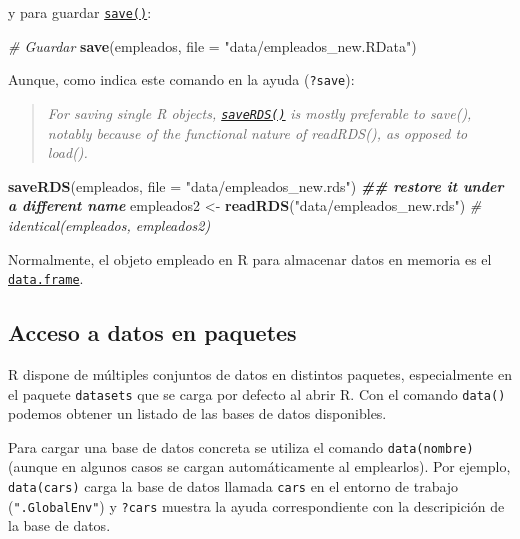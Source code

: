 \documentclass[
]{book}
\newenvironment{Shaded}{\begin{snugshade}}{\end{snugshade}}
\newcommand{\AttributeTok}[1]{\textcolor[rgb]{0.13,0.29,0.53}{#1}}
\newcommand{\CommentTok}[1]{\textcolor[rgb]{0.56,0.35,0.01}{\textit{#1}}}
\newcommand{\DocumentationTok}[1]{\textcolor[rgb]{0.56,0.35,0.01}{\textbf{\textit{#1}}}}
\newcommand{\FunctionTok}[1]{\textcolor[rgb]{0.13,0.29,0.53}{\textbf{#1}}}
\newcommand{\NormalTok}[1]{#1}
\newcommand{\OtherTok}[1]{\textcolor[rgb]{0.56,0.35,0.01}{#1}}
\newcommand{\StringTok}[1]{\textcolor[rgb]{0.31,0.60,0.02}{#1}}
\begin{document}
y para guardar \href{https://www.rdocumentation.org/packages/base/versions/3.6.1/topics/save}{\texttt{save()}}:

\begin{Shaded}
\begin{Highlighting}[]
\CommentTok{\# Guardar}
\FunctionTok{save}\NormalTok{(empleados, }\AttributeTok{file =} \StringTok{"data/empleados\_new.RData"}\NormalTok{)}
\end{Highlighting}
\end{Shaded}

Aunque, como indica este comando en la ayuda (\texttt{?save}):

\begin{quote}
\emph{For saving single R objects, \href{https://www.rdocumentation.org/packages/base/versions/3.6.1/topics/saveRDS}{\texttt{saveRDS()}}}
\emph{is mostly preferable to save(),}
\emph{notably because of the functional nature of readRDS(), as opposed to load().}
\end{quote}

\begin{Shaded}
\begin{Highlighting}[]
\FunctionTok{saveRDS}\NormalTok{(empleados, }\AttributeTok{file =} \StringTok{"data/empleados\_new.rds"}\NormalTok{)}
\DocumentationTok{\#\# restore it under a different name}
\NormalTok{empleados2 }\OtherTok{\textless{}{-}} \FunctionTok{readRDS}\NormalTok{(}\StringTok{"data/empleados\_new.rds"}\NormalTok{)}
\CommentTok{\# identical(empleados, empleados2)}
\end{Highlighting}
\end{Shaded}

Normalmente, el objeto empleado en R para almacenar datos en memoria
es el \href{https://www.rdocumentation.org/packages/base/versions/3.6.1/topics/data.frame}{\texttt{data.frame}}.

\hypertarget{acceso-a-datos-en-paquetes}{%
\subsection{Acceso a datos en paquetes}\label{acceso-a-datos-en-paquetes}}

R dispone de múltiples conjuntos de datos en distintos paquetes, especialmente en el paquete \texttt{datasets}
que se carga por defecto al abrir R.
Con el comando \texttt{data()} podemos obtener un listado de las bases de datos disponibles.

Para cargar una base de datos concreta se utiliza el comando
\texttt{data(nombre)} (aunque en algunos casos se cargan automáticamente al emplearlos).
Por ejemplo, \texttt{data(cars)} carga la base de datos llamada \texttt{cars} en el entorno de trabajo (\texttt{".GlobalEnv"})
y \texttt{?cars} muestra la ayuda correspondiente con la descripición de la base de datos.
\end{document}
